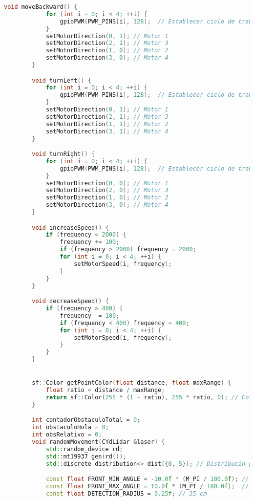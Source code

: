 \begin{lstlisting}[language={C++}, caption={Primera versi\'on del c\'odigo del sistema de control del robot}, label={Script}]
        void moveBackward() {
            for (int i = 0; i < 4; ++i) {
                gpioPWM(PWM_PINS[i], 128);  // Establecer ciclo de trabajo al 50%
            }
            setMotorDirection(0, 1); // Motor 1
            setMotorDirection(2, 1); // Motor 3
            setMotorDirection(1, 0); // Motor 2
            setMotorDirection(3, 0); // Motor 4
        }

        void turnLeft() {
            for (int i = 0; i < 4; ++i) {
                gpioPWM(PWM_PINS[i], 128);  // Establecer ciclo de trabajo al 50%
            }
            setMotorDirection(0, 1); // Motor 1
            setMotorDirection(2, 1); // Motor 3
            setMotorDirection(1, 1); // Motor 2
            setMotorDirection(3, 1); // Motor 4
        }

        void turnRight() {
            for (int i = 0; i < 4; ++i) {
                gpioPWM(PWM_PINS[i], 128);  // Establecer ciclo de trabajo al 50%
            }
            setMotorDirection(0, 0); // Motor 1
            setMotorDirection(2, 0); // Motor 3
            setMotorDirection(1, 0); // Motor 2
            setMotorDirection(3, 0); // Motor 4
        }

        void increaseSpeed() {
            if (frequency < 2000) {
                frequency += 100;
                if (frequency > 2000) frequency = 2000;
                for (int i = 0; i < 4; ++i) {
                    setMotorSpeed(i, frequency);
                }
            }
        }

        void decreaseSpeed() {
            if (frequency > 400) {
                frequency -= 100;
                if (frequency < 400) frequency = 400;
                for (int i = 0; i < 4; ++i) {
                    setMotorSpeed(i, frequency);
                }
            }
        }


        sf::Color getPointColor(float distance, float maxRange) {
            float ratio = distance / maxRange;
            return sf::Color(255 * (1 - ratio), 255 * ratio, 0); // Color de rojo a verde
        }

        int contadorObstaculoTotal = 0;
        int obstaculoHola = 0;
        int obsRelativo = 0;
        void randomMovement(CYdLidar &laser) {
            std::random_device rd;
            std::mt19937 gen(rd());
            std::discrete_distribution<> dist({0, 5}); // Distribucin para la probabilidad de movimiento

            const float FRONT_MIN_ANGLE = -10.0f * (M_PI / 180.0f); // -15 grados en radaianes
            const float FRONT_MAX_ANGLE = 10.0f * (M_PI / 180.0f);  // 15 grados en radianes
            const float DETECTION_RADIUS = 0.25f; // 35 cm


\end{lstlisting}
